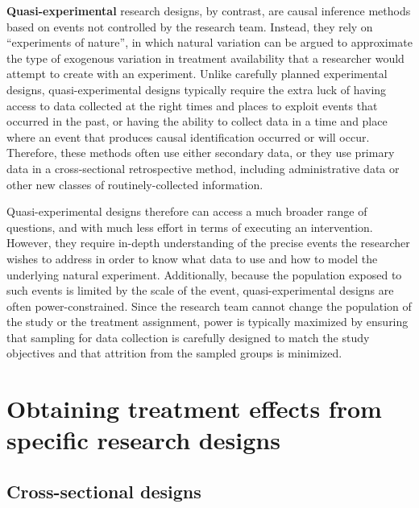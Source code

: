 \textbf{Quasi-experimental} research designs,
by contrast, are causal inference methods based on events not controlled by the research team.
Instead, they rely on ``experiments of nature'',
in which natural variation can be argued to approximate
the type of exogenous variation in treatment availability
that a researcher would attempt to create with an experiment.\cite{dinardo2016natural}
Unlike carefully planned experimental designs,
quasi-experimental designs typically require the extra luck
of having access to data collected at the right times and places
to exploit events that occurred in the past,
or having the ability to collect data in a time and place
where an event that produces causal identification occurred or will occur.
Therefore, these methods often use either secondary data,
or they use primary data in a cross-sectional retrospective method,
including administrative data or other new classes of routinely-collected information.

Quasi-experimental designs therefore can access a much broader range of questions,
and with much less effort in terms of executing an intervention.
However, they require in-depth understanding of the precise events
the researcher wishes to address in order to know what data to use
and how to model the underlying natural experiment.
Additionally, because the population exposed
to such events is limited by the scale of the event,
quasi-experimental designs are often power-constrained.
Since the research team cannot change the population of the study
or the treatment assignment, power is typically maximized by ensuring
that sampling for data collection is carefully designed to match the study objectives
and that attrition from the sampled groups is minimized.

\section{Obtaining treatment effects from specific research designs}


\subsection{Cross-sectional designs}

